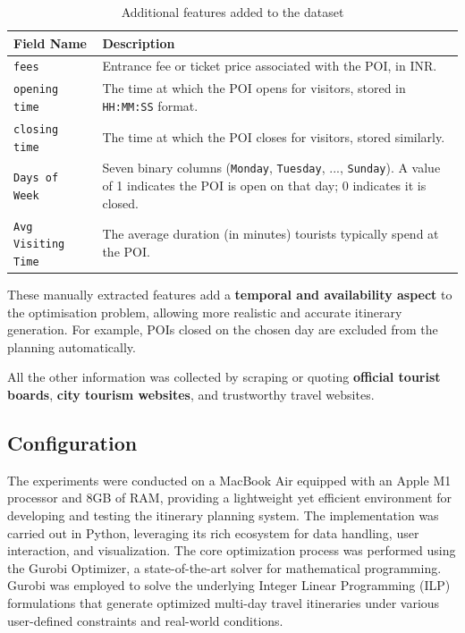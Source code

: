 \begin{table}[H]
\centering
\begin{tabularx}{0.5\textwidth}{p{3cm} X}
\toprule
\textbf{Field Name} & \textbf{Description} \\
\midrule
\texttt{fees} & Entrance fee or ticket price associated with the POI, in INR. \\
\midrule
\texttt{opening time} & The time at which the POI opens for visitors, stored in \texttt{HH:MM:SS} format. \\
\midrule
\texttt{closing time} & The time at which the POI closes for visitors, stored similarly. \\
\midrule
\texttt{Days of Week} & Seven binary columns (\texttt{Monday}, \texttt{Tuesday}, ..., \texttt{Sunday}). A value of 1 indicates the POI is open on that day; 0 indicates it is closed. \\
\midrule
\texttt{Avg Visiting Time} & The average duration (in minutes) tourists typically spend at the POI. \\
\bottomrule
\end{tabularx}
\caption{Additional features added to the dataset}
\end{table}

These manually extracted features add a \textbf{temporal and availability aspect} to the optimisation problem, allowing more realistic and accurate itinerary generation. For example, POIs closed on the chosen day are excluded from the planning automatically.

All the other information was collected by scraping or quoting \textbf{official tourist boards}, \textbf{city tourism websites}, and trustworthy travel websites.

\subsection{Configuration}

The experiments were conducted on a MacBook Air equipped with an Apple M1 processor and 8GB of RAM, providing a lightweight yet efficient environment for developing and testing the itinerary planning system. The implementation was carried out in Python, leveraging its rich ecosystem for data handling, user interaction, and visualization. The core optimization process was performed using the Gurobi Optimizer, a state-of-the-art solver for mathematical programming. Gurobi was employed to solve the underlying Integer Linear Programming (ILP) formulations that generate optimized multi-day travel itineraries under various user-defined constraints and real-world conditions.

